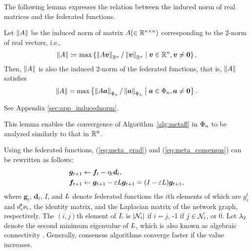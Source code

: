 \documentclass[journal]{IEEEtran}
\begin{document}
The following lemma expresses the relation between the induced norm of real matrices and the federated functions.
\begin{lemma} \label{lemm:inducednorm}
  Let $\left\lVert A \right\rVert$ be the induced norm of matrix $A (\in\mathbb{R}^{n\times n})$
  corresponding to the 2-norm of real vectors,
  i.e.,
  \begin{align}
    \left\lVert A \right\rVert\coloneqq\max \left\{\left\lVert A\bm{v} \right\rVert_{\mathbb{R}^n}/\left\lVert \bm{v} \right\rVert_{\mathbb{R}^n} \mathrel{}\middle|\mathrel{} \bm{v}\in\mathbb{R}^n, \bm{v} \neq\bm{0} \right\}. \label{eq:def_inducednorm}
  \end{align}
  Then, $\left\lVert A \right\rVert$ is also the induced 2-norm of the federated functions, that is, $\left\lVert A \right\rVert$ satisfies
  \begin{align}
    \left\lVert A \right\rVert = \max \left\{\left\lVert A\bm{a} \right\rVert_{\Phi_{n}}/\left\lVert \bm{a} \right\rVert_{\Phi_{n}} \mathrel{}\middle|\mathrel{} \bm{a}\in\Phi_{n}, \bm{a} \neq\bm{0} \right\}.
  \end{align}
\end{lemma}
\begin{IEEEproof}
  See Appendix \ref{sec:app_inducednorm}.
\end{IEEEproof}
This lemma enables the convergence of Algorithm~\ref{alg:metafl} in $\Phi_{n}$ to be analyzed similarly to that in $\mathbb{R}^n$.

Using the federated functions, (\ref{eq:meta_grad}) and (\ref{eq:meta_consensus}) can be rewritten as follows:
\begin{align}
  \bm{g}_{t+1} &\leftarrow \bm{f}_{t} - \eta_t \bm{d}_t, \label{eq:meta_grad_all} \\
  \bm{f}_{t+1} &\leftarrow \bm{g}_{t+1} - \varepsilon L \bm{g}_{t+1} = (I-\varepsilon L) \bm{g}_{t+1}, \label{eq:meta_consensus_all}
\end{align}
where $\bm{g}_t$, $\bm{d}_t$, $I$, and $L$ denote federated functions the $i$th elements of which are $g_i^t$ and $d_i^t \nu_i$,
the identity matrix, and the Laplacian matrix of the network graph, respectively.
The $(i,j)$th element of $L$ is $\vert{\mathcal{N}_{i}}\vert$ if $i=j$, -1 if $j\in\mathcal{N}_{i}$, or 0.
Let $\lambda_2$ denote the second minimum eigenvalue of $L$, which is also known as algebraic connectivity \cite{fiedler1973algebraic}.
Generally, consensus algorithms converge faster if the value increases.
\end{document}
